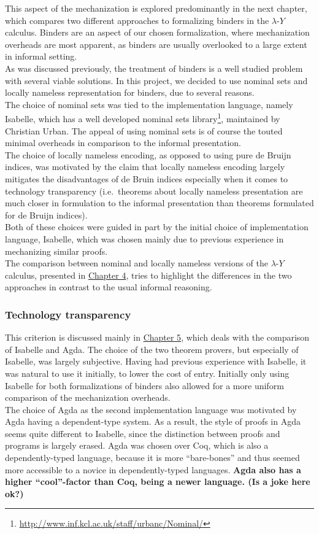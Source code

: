 \documentclass[a4paper, 12pt, twoside]{style/ociamthesis}
\theoremstyle{plain}
\theoremstyle{definition}
\theoremstyle{remark}
\renewcommand{\href}[2]{#2\footnote{\url{#1}}}
\newcommand{\lamy}{\lambda\text{-}Y}
\begin{document}
This aspect of the mechanization is explored predominantly in the next
chapter, which compares two different approaches to formalizing binders
in the \(\lamy\) calculus. Binders are an aspect of our chosen
formalization, where mechanization overheads are most apparent, as
binders are usually overlooked to a large extent in informal setting.\\
As was discussed previously, the treatment of binders is a well studied
problem with several viable solutions. In this project, we decided to
use nominal sets and locally nameless representation for binders, due to
several reasons.\\
The choice of nominal sets was tied to the implementation language,
namely Isabelle, which has a well developed
\href{http://www.inf.kcl.ac.uk/staff/urbanc/Nominal/}{nominal sets
library}, maintained by Christian Urban. The appeal of using nominal
sets is of course the touted minimal overheads in comparison to the
informal presentation.\\
The choice of locally nameless encoding, as opposed to using pure de
Bruijn indices, was motivated by the claim that locally nameless
encoding largely mitigates the disadvantages of de Bruin indices
especially when it comes to technology transparency (i.e.~theorems about
locally nameless presentation are much closer in formulation to the
informal presentation than theorems formulated for de Bruijn indices).\\
Both of these choices were guided in part by the initial choice of
implementation language, Isabelle, which was chosen mainly due to
previous experience in mechanizing similar proofs.\\
The comparison between nominal and locally nameless versions of the
\(\lamy\) calculus, presented in \protect\hyperlink{comp-isa}{Chapter
4}, tries to highlight the differences in the two approaches in contrast
to the usual informal reasoning.

\subsubsection{Technology transparency}\label{technology-transparency}

This criterion is discussed mainly in
\protect\hyperlink{comp-agda}{Chapter 5}, which deals with the
comparison of Isabelle and Agda. The choice of the two theorem provers,
but especially of Isabelle, was largely subjective. Having had previous
experience with Isabelle, it was natural to use it initially, to lower
the cost of entry. Initially only using Isabelle for both formalizations
of binders also allowed for a more uniform comparison of the
mechanization overheads.\\
The choice of Agda as the second implementation language was motivated
by Agda having a dependent-type system. As a result, the style of proofs
in Agda seems quite different to Isabelle, since the distinction between
proofs and programs is largely erased. Agda was chosen over Coq, which
is also a dependently-typed language, because it is more ``bare-bones''
and thus seemed more accessible to a novice in dependently-typed
languages. \textbf{Agda also has a higher ``cool''-factor than Coq,
being a newer language. (Is a joke here ok?)}
\end{document}

